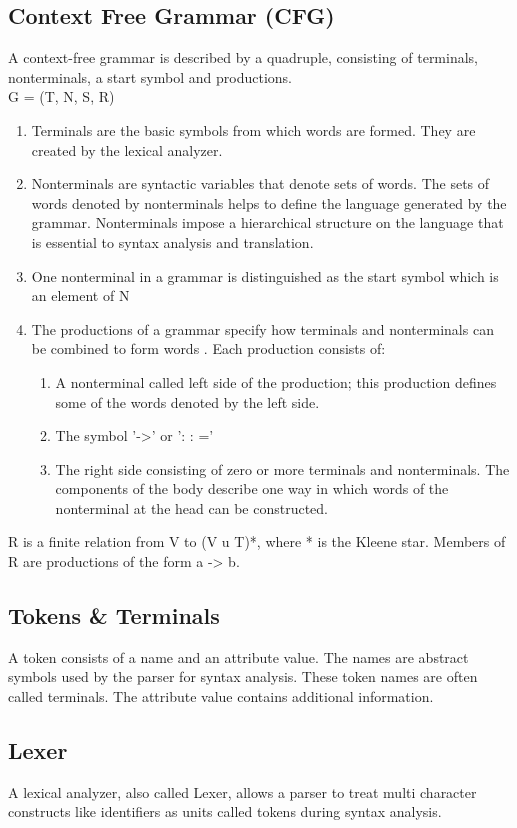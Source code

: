 \subsection{Context Free Grammar (CFG)}
A context-free grammar is described by a quadruple, consisting of terminals, nonterminals, a start symbol and productions.
\\G = (T, N, S, R)
\begin{enumerate}
	\item Terminals are the basic symbols from which words are formed.  They are created by the lexical analyzer.
	\item Nonterminals are syntactic variables that denote sets of words. The sets of words denoted by nonterminals helps to define the language generated by the grammar. Nonterminals impose a hierarchical structure on the language that is essential to syntax analysis and translation.
	\item One nonterminal in a grammar is distinguished as the start symbol which is an element of N
	\item The productions of a grammar specify how terminals and nonterminals can be combined to form words . Each production consists of:
	\begin{enumerate}
		\item A nonterminal called left side of the production; this production defines some of the words denoted by the left side.
		\item The symbol '->'  or  ': : =' 
		\item The right side consisting of zero or more terminals and nonterminals. The components of the body describe one way in which words of the nonterminal at the head can be constructed.
	\end{enumerate}
\end{enumerate}
 R is a finite relation from V to (V u T)*, where * is the Kleene star. Members of R are productions of the form a -> b.\cite{DragonBook}


\subsection{Tokens \& Terminals}  
A token consists of a name and an attribute value. The names are abstract symbols used by the parser for syntax analysis. These token names are often called terminals. The attribute value contains additional information.\cite{DragonBook}


\subsection{Lexer}
A lexical analyzer, also called Lexer, allows a parser to treat multi character constructs like identifiers as units called tokens during syntax analysis.\cite{DragonBook}

